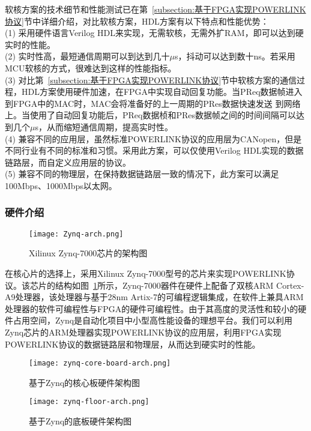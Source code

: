 软核方案的技术细节和性能测试已在第~\ref{subsection:基于FPGA实现POWERLINK协议}节中详细介绍，对比软核方案，HDL方案有以下特点和性能优势：\\
(1) 采用硬件语言Verilog HDL来实现，无需软核，无需外扩RAM，即可以达到硬实时的性能。\\
(2) 实时性高，最短通信周期可以到达到几十$\mu$s，抖动可以达到数十ns。若采用MCU软核的方式，很难达到这样的性能指标。\\
(3) 对比第~\ref{subsection:基于FPGA实现POWERLINK协议}节中软核方案的通信过程，HDL方案使用硬件加速，在FPGA中实现自动回复功能。当PReq数据帧进入到FPGA中的MAC时，MAC会将准备好的上一周期的PRes数据快速发送 到网络上。当使用了自动回复功能后，PReq数据桢和PRes数据帧之间的时间间隔可以达到几个$\mu$s，从而缩短通信周期，提高实时性。\\
(4) 兼容不同的应用层，虽然标准POWERLINK协议的应用层为CANopen，但是不同行业有不同的标准和习惯。采用此方案，可以仅使用Verilog HDL实现的数据链路层，而自定义应用层的协议。\\
(5) 兼容不同的物理层，在保持数据链路层一致的情况下，此方案可以满足100Mbps、1000Mbps以太网。


\subsubsection{硬件介绍}

\begin{figure}[!htb]
  \centering
  \texttt{[image: Zynq-arch.png]}
  \caption{Xilinux Zynq-7000芯片的架构图}
  \label{fig:Zynq-arch}
\end{figure}

在核心片的选择上，采用Xilinux Zynq-7000型号的芯片来实现POWERLINK协议。该芯片的结构如图~\ref{fig:Zynq-arch}所示，Zynq-7000器件在硬件上配备了双核ARM Cortex-A9处理器，该处理器与基于28nm Artix-7的可编程逻辑集成，在软件上兼具ARM处理器的软件可编程性与FPGA的硬件可编程性。由于其高度的灵活性和较小的硬件占用空间，Zynq是自动化项目中小型高性能设备的理想平台\cite{zynq-7000}。我们可以利用Zynq芯片的ARM处理器实现POWERLINK协议的应用层，利用FPGA实现POWERLINK协议的数据链路层和物理层，从而达到硬实时的性能。

\begin{figure}[!htb]
  \centering
  \texttt{[image: zynq-core-board-arch.png]}
  \caption{基于Zynq的核心板硬件架构图}
  \label{fig:zynq-core-board-arch}
\end{figure}

\begin{figure}[!htb]
  \centering
  \texttt{[image: zynq-floor-arch.png]}
  \caption{基于Zynq的底板硬件架构图}
  \label{fig:zynq-floor-arch}
\end{figure}

